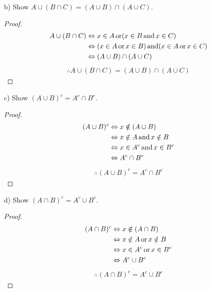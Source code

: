 \documentclass[12pt]{article}
\theoremstyle{definition}
\newenvironment{problem}[2][Problem]{\begin{trivlist}
    \item[\hskip \labelsep {\bfseries #1}\hskip \labelsep {\bfseries #2.}]}{\end{trivlist}}
\newcommand{\textop}[1]{\relax\ifmmode\mathop{\text{#1}}\else\text{#1}\fi} %
\begin{document}
\begin{problem}{1}
    (b) Show $A \cup (B \cap C) = (A \cup B) \cap (A \cup C)$.
\end{problem}
\begin{proof}
    \begin{align}
        A \cup (B \cap C) & \Leftrightarrow x \in A \textop{or} (x \in B \textop{and} x \in C) \\
        & \Leftrightarrow (x \in A \textop{or} x \in B) \textop{and} (x \in A \textop{or} x \in C)\\
        & \Leftrightarrow (A \cup B) \cap (A \cup C) 
    \end{align}
    \begin{align*}
        \therefore A \cup (B \cap C) = (A \cup B) \cap (A \cup C)
    \end{align*}
\end{proof}

\begin{problem}{2}
    (c) Show $(A \cup B)^c = A^c \cap B^c$.
\end{problem}
\begin{proof}
    \begin{align}
        (A \cup B)^c & \Leftrightarrow x \notin (A \cup B) \\
        & \Leftrightarrow x \notin A \textop{and} x \notin B\\
        & \Leftrightarrow x \in A^c \textop{and} x \in B^c \\
        & \Leftrightarrow A^c \cap B^c
    \end{align}
    \begin{align*}
        \therefore (A \cup B)^c = A^c \cap B^c
    \end{align*}
\end{proof}

\begin{problem}{3}
    (d) Show $(A \cap B)^c = A^c \cup B^c$.
\end{problem}
\begin{proof}
    \begin{align}
        (A \cap B)^c & \Leftrightarrow x \notin (A \cap B) \\
        & \Leftrightarrow x \notin A \textop{or} x \notin B\\
        & \Leftrightarrow x \in A^c \textop{or} x \in B^c \\
        & \Leftrightarrow A^c \cup B^c
    \end{align}
    \begin{align*}
        \therefore (A \cap B)^c = A^c \cup B^c
    \end{align*}
\end{proof}
\end{document}
